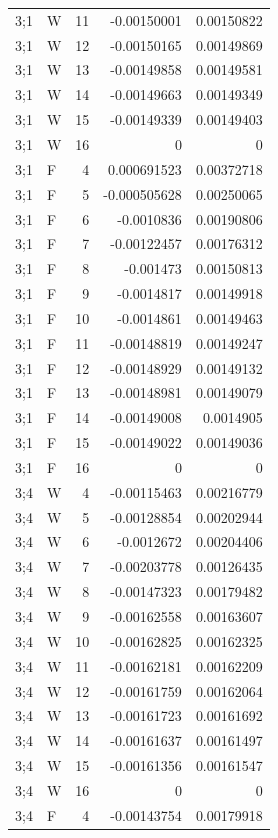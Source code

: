 {\begin{longtable}{@{}llrrr@{}}
3;1 & W & 11 & -0.00150001 & 0.00150822 \\
3;1 & W & 12 & -0.00150165 & 0.00149869 \\
3;1 & W & 13 & -0.00149858 & 0.00149581 \\
3;1 & W & 14 & -0.00149663 & 0.00149349 \\
3;1 & W & 15 & -0.00149339 & 0.00149403 \\
3;1 & W & 16 & 0 & 0 \\
3;1 & F & 4 & 0.000691523 & 0.00372718 \\
3;1 & F & 5 & -0.000505628 & 0.00250065 \\
3;1 & F & 6 & -0.0010836 & 0.00190806 \\
3;1 & F & 7 & -0.00122457 & 0.00176312 \\
3;1 & F & 8 & -0.001473 & 0.00150813 \\
3;1 & F & 9 & -0.0014817 & 0.00149918 \\
3;1 & F & 10 & -0.0014861 & 0.00149463 \\
3;1 & F & 11 & -0.00148819 & 0.00149247 \\
3;1 & F & 12 & -0.00148929 & 0.00149132 \\
3;1 & F & 13 & -0.00148981 & 0.00149079 \\
3;1 & F & 14 & -0.00149008 & 0.0014905 \\
3;1 & F & 15 & -0.00149022 & 0.00149036 \\
3;1 & F & 16 & 0 & 0 \\
3;4 & W & 4 & -0.00115463 & 0.00216779 \\
3;4 & W & 5 & -0.00128854 & 0.00202944 \\
3;4 & W & 6 & -0.0012672 & 0.00204406 \\
3;4 & W & 7 & -0.00203778 & 0.00126435 \\
3;4 & W & 8 & -0.00147323 & 0.00179482 \\
3;4 & W & 9 & -0.00162558 & 0.00163607 \\
3;4 & W & 10 & -0.00162825 & 0.00162325 \\
3;4 & W & 11 & -0.00162181 & 0.00162209 \\
3;4 & W & 12 & -0.00161759 & 0.00162064 \\
3;4 & W & 13 & -0.00161723 & 0.00161692 \\
3;4 & W & 14 & -0.00161637 & 0.00161497 \\
3;4 & W & 15 & -0.00161356 & 0.00161547 \\
3;4 & W & 16 & 0 & 0 \\
3;4 & F & 4 & -0.00143754 & 0.00179918 \\

\end{longtable}}
